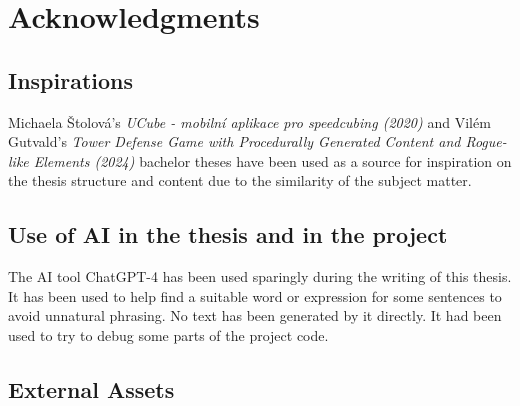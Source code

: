 \chapter{Acknowledgments}

\section{Inspirations}
Michaela Štolová's \textit{UCube - mobilní aplikace pro speedcubing (2020)} \cite{Stolova2020} and Vilém Gutvald's \textit{Tower Defense Game with Procedurally Generated Content and Rogue-like Elements (2024)} \cite{Gutvald2024} bachelor theses have been used as a source for inspiration on the thesis structure and content due to the similarity of the subject matter.

\section{Use of AI in the thesis and in the project}
The AI tool ChatGPT-4 has been used sparingly during the writing of this thesis. It has been used to help find a suitable word or expression for some sentences to avoid unnatural phrasing. No text has been generated by it directly. It had been used to try to debug some parts of the project code.

\section{External Assets}